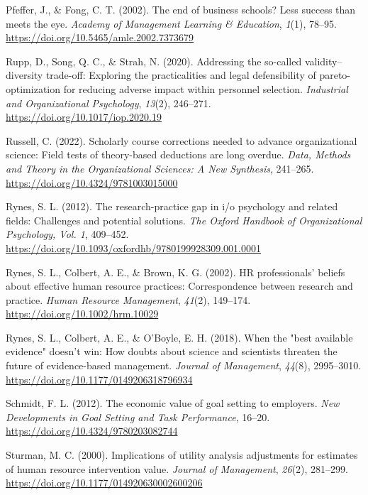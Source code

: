 \documentclass[
  english,
  man]{apa6}
\newlength{\cslhangindent}
\newenvironment{CSLReferences}[2] %
 {\begin{list}{}{%
  \setlength{\itemindent}{0pt}
  \setlength{\leftmargin}{0pt}
  \setlength{\parsep}{0pt}
  \ifodd #1
   \setlength{\leftmargin}{\cslhangindent}
   \setlength{\itemindent}{-1\cslhangindent}
  \fi
  \setlength{\itemsep}{#2\baselineskip}}}
 {\end{list}}
\begin{document}
\begin{CSLReferences}{1}{0}
Pfeffer, J., \& Fong, C. T. (2002). The end of business schools? Less success than meets the eye. \emph{Academy of Management Learning \& Education}, \emph{1}(1), 78--95. \url{https://doi.org/10.5465/amle.2002.7373679}

Rupp, D., Song, Q. C., \& Strah, N. (2020). Addressing the so-called validity--diversity trade-off: Exploring the practicalities and legal defensibility of pareto-optimization for reducing adverse impact within personnel selection. \emph{Industrial and Organizational Psychology}, \emph{13}(2), 246--271. \url{https://doi.org/10.1017/iop.2020.19}

Russell, C. (2022). Scholarly course corrections needed to advance organizational science: Field tests of theory-based deductions are long overdue. \emph{Data, Methods and Theory in the Organizational Sciences: A New Synthesis}, 241--265. \url{https://doi.org/10.4324/9781003015000}

Rynes, S. L. (2012). The research-practice gap in i/o psychology and related fields: Challenges and potential solutions. \emph{The Oxford Handbook of Organizational Psychology, Vol. 1}, 409--452. \url{https://doi.org/10.1093/oxfordhb/9780199928309.001.0001}

Rynes, S. L., Colbert, A. E., \& Brown, K. G. (2002). HR professionals' beliefs about effective human resource practices: Correspondence between research and practice. \emph{Human Resource Management}, \emph{41}(2), 149--174. \url{https://doi.org/10.1002/hrm.10029}

Rynes, S. L., Colbert, A. E., \& O'Boyle, E. H. (2018). When the "best available evidence" doesn't win: How doubts about science and scientists threaten the future of evidence-based management. \emph{Journal of Management}, \emph{44}(8), 2995--3010. \url{https://doi.org/10.1177/0149206318796934}

Schmidt, F. L. (2012). The economic value of goal setting to employers. \emph{New Developments in Goal Setting and Task Performance}, 16--20. \url{https://doi.org/10.4324/9780203082744}

Sturman, M. C. (2000). Implications of utility analysis adjustments for estimates of human resource intervention value. \emph{Journal of Management}, \emph{26}(2), 281--299. \url{https://doi.org/10.1177/014920630002600206}


\end{CSLReferences}
\end{document}
